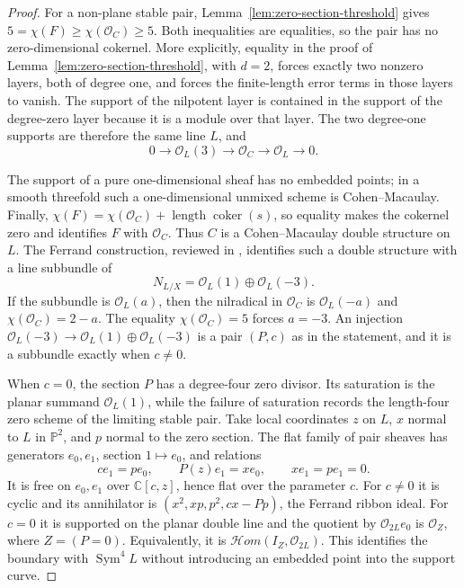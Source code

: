 \documentclass[11pt,reqno]{amsart}
\theoremstyle{definition}
\newcommand{\C}{\mathbb C}
\newcommand{\Pp}{\mathbb P}
\newcommand{\Ocal}{\mathcal O}
\begin{document}
\begin{proof}
For a non-plane stable pair, Lemma~\ref{lem:zero-section-threshold} gives
$5=\chi(F)\ge\chi(\Ocal_C)\ge5$.  Both inequalities are equalities, so the
pair has no zero-dimensional cokernel.  More explicitly, equality in the
proof of Lemma~\ref{lem:zero-section-threshold}, with $d=2$, forces exactly
two nonzero layers, both of degree one, and forces the finite-length error
terms in those layers to vanish.  The support of the nilpotent layer is
contained in the support of the degree-zero layer because it is a module
over that layer.  The two degree-one supports are therefore the same line
$L$, and
\[
 0\longrightarrow\Ocal_L(3)\longrightarrow\Ocal_C
 \longrightarrow\Ocal_L\longrightarrow0.
\]

The support of a pure one-dimensional sheaf has no embedded points; in a
smooth threefold such a one-dimensional unmixed scheme is
Cohen--Macaulay.  Finally,
$\chi(F)=\chi(\Ocal_C)+\operatorname{length}\operatorname{coker}(s)$, so equality makes
the cokernel zero and identifies $F$ with $\Ocal_C$.  Thus $C$ is a
Cohen--Macaulay double structure on $L$.  The Ferrand construction, reviewed in
\cite[Chapter~3]{Carlucci}, identifies such a
double structure with a line subbundle of
\[
 N_{L/X}=\Ocal_L(1)\oplus\Ocal_L(-3).
\]
If the subbundle is $\Ocal_L(a)$, then the nilradical in $\Ocal_C$ is
$\Ocal_L(-a)$ and $\chi(\Ocal_C)=2-a$.  The equality
$\chi(\Ocal_C)=5$ forces $a=-3$.  An injection
$\Ocal_L(-3)\to\Ocal_L(1)\oplus\Ocal_L(-3)$ is a pair $(P,c)$ as in the
statement, and it is a subbundle exactly when $c\ne0$.

When $c=0$, the section $P$ has a degree-four zero divisor.  Its saturation
is the planar summand $\Ocal_L(1)$, while the failure of saturation records
the length-four zero scheme of the limiting stable pair.  Take local
coordinates $z$ on $L$, $x$ normal to $L$ in $\Pp^2$, and $p$
normal to the zero section.  The flat family of pair sheaves has generators
$e_0,e_1$, section $1\mapsto e_0$, and relations
\[
 ce_1=pe_0,\qquad P(z)e_1=xe_0,\qquad xe_1=pe_1=0.
\]
It is free on $e_0,e_1$ over $\C[c,z]$, hence flat over the parameter $c$.
For $c\ne0$ it is cyclic and its annihilator is
$(x^2,xp,p^2,cx-Pp)$, the Ferrand ribbon ideal.  For $c=0$ it is supported
on the planar double line and the quotient by $\Ocal_{2L}e_0$ is
$\Ocal_Z$, where $Z=(P=0)$.  Equivalently, it is
$\mathcal{H}\!om(I_Z,\Ocal_{2L})$.  This identifies the boundary with
$\operatorname{Sym}^4L$ without introducing an embedded point into the
support curve.


\end{proof}
\end{document}

